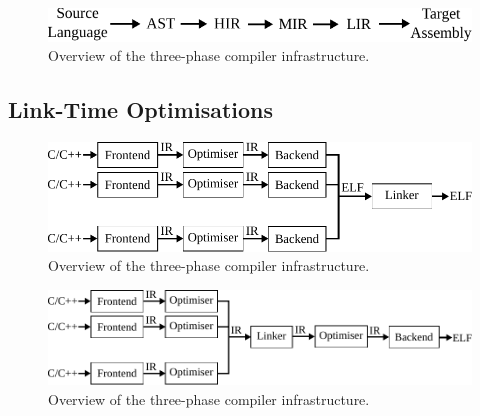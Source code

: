 \begin{figure}[h]
  \centering
  \includegraphics[scale=0.9]{src/background/figs/ir-lowering-sequence.pdf}
  \caption{Overview of the three-phase compiler infrastructure.}
  \label{fig:ir-lowering-sequence}
\end{figure}

\subsection{Link-Time Optimisations}

\begin{figure}[h]
  \centering
  \includegraphics[scale=0.85]{src/background/figs/full-pipeline.pdf}
  \caption{Overview of the three-phase compiler infrastructure.}
  \label{fig:ir-lowering-sequence}
\end{figure}

\begin{figure}[h]
  \centering
  \includegraphics[scale=0.85]{src/background/figs/full-pipeline-LTO.pdf}
  \caption{Overview of the three-phase compiler infrastructure.}
  \label{fig:ir-lowering-sequence}
\end{figure}
